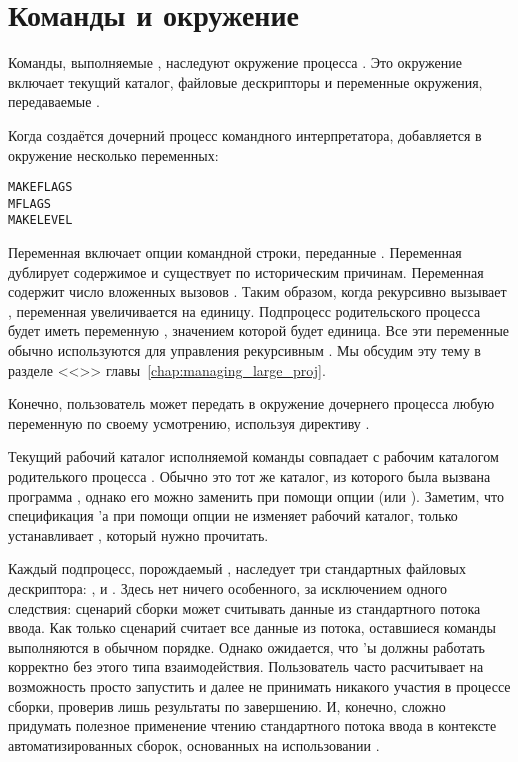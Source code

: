 \section{Команды и окружение}
\label{sec:command_environment}

Команды, выполняемые \GNUmake{}, наследуют окружение процесса
\GNUmake{}. Это окружение включает текущий каталог, файловые
дескрипторы и переменные окружения, передаваемые \GNUmake{}.

Когда создаётся дочерний процесс командного интерпретатора, \GNUmake{}
добавляется в окружение несколько переменных:

{\footnotesize
\begin{verbatim}
MAKEFLAGS
MFLAGS
MAKELEVEL
\end{verbatim}
}

Переменная  включает опции командной строки,
переданные \GNUmake{}. Переменная  дублирует
содержимое  и существует по историческим причинам.
Переменная  содержит число вложенных вызовов
\GNUmake{}. Таким образом, когда \GNUmake{} рекурсивно вызывает
\GNUmake{}, переменная  увеличивается на единицу.
Подпроцесс родительского процесса \GNUmake{} будет иметь переменную
, значением которой будет единица. Все эти
переменные обычно используются для управления рекурсивным \GNUmake{}.
Мы обсудим эту тему в разделе <<>>
главы~\ref{chap:managing_large_proj}.

Конечно, пользователь может передать в окружение дочернего процесса
любую переменную по своему усмотрению, используя директиву
.

Текущий рабочий каталог исполняемой команды совпадает с рабочим
каталогом родителького процесса \GNUmake{}. Обычно это тот же каталог,
из которого была вызвана программа \GNUmake{}, однако его можно
заменить при помощи опции  (или
). Заметим, что спецификация \Makefile{}'а при помощи
опции  не изменяет рабочий каталог, только
устанавливает \Makefile{}, который нужно прочитать.

Каждый подпроцесс, порождаемый \GNUmake{}, наследует три стандартных
файловых дескриптора: ,  и
. Здесь нет ничего особенного, за исключением одного
следствия: сценарий сборки может считывать данные из стандартного
потока ввода. Как только сценарий считает все данные из потока,
оставшиеся команды выполняются в обычном порядке. Однако ожидается,
что \Makefile{}'ы должны работать корректно без этого типа
взаимодействия. Пользователь часто расчитывает на возможность просто
запустить \GNUmake{} и далее не принимать никакого участия в процессе
сборки, проверив лишь результаты по завершению. И, конечно, сложно
придумать полезное применение чтению стандартного потока ввода в
контексте автоматизированных сборок, основанных на использовании
.

